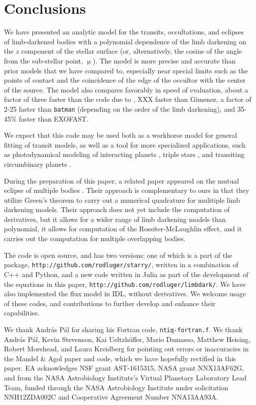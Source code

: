 \documentclass[modern]{aastex61}
\begin{document}
\section{Conclusions}

We have presented an analytic model for the transits, occultations, and
eclipses of limb-darkened bodies with a polynomial dependence of the limb darkening
on the $z$ component of the stellar surface (or, alternatively, the
cosine of the angle from the sub-stellar point, $\upmu$).  The model is more precise
and accurate than prior models that we have compared to, especially near
special limits such as the points of contact and the coincidence of the edge
of the occultor with the center of the source.  The model also compares favorably in
speed of evaluation, about a factor of three faster than the code due
to \citet{Pal2008}, XXX faster than Gimenez, a factor of 2-25 faster than \texttt{batman}
(depending on the order of the limb darkening), and 35-45\% faster than EXOFAST.

We expect that this code may be used both as a workhorse model for
general fitting of transit models, as well as a tool for more
specialized applications, such as photodynamical modeling of
interacting planets \citep{Carter2012}, triple stars \citep{Carter2011}, and 
transiting circumbinary planets \citep{Doyle2011}.

During the preparation of this paper, a related paper appeared on
the mutual eclipse of multiple bodies \citep{Short2018}.  Their
approach is complementary to ours in that they utilize Green's theorem to
carry out a numerical quadrature for mulitiple limb darkening models.
Their approach does not yet include the computation of derivatives, but 
it allows for a wider range of limb darkening models than polynomial, it
allows for computation of the Rossiter-McLaughlin effect, and it 
carries out the computation for multiple overlapping bodies.

The code is open source, and has two versions:  one of which is a part
of the \starry package, \texttt{http://github.com/rodluger/starry/}, written
in a combination of C++ and Python, and a new code written in Julia as
part of the development of the equations in this paper,
\texttt{http://github.com/rodluger/limbdark/}.  We have also implemented
the flux model in IDL, without derivatives. We welcome usage of these
codes, and contributions to further develop and enhance their capabilities.

\acknowledgements

We thank Andr\'as P\'al for sharing his Fortran code, \texttt{ntiq-fortran.f}.
We thank Andr\'as P\'al, Kevin Stevenson, Kai Ueltzh\"offer, Mario Damasso,
Matthew Heising, Robert Morehead, and Laura Kreidberg for pointing out
errors or inaccuracies in the Mandel \& Agol paper and code, which we have
hopefully rectified in this paper.
EA acknowledges NSF grant AST-1615315, NASA grant NNX13AF62G, and from
the NASA Astrobiology Institute's Virtual Planetary Laboratory Lead Team,
funded through the NASA Astrobiology Institute under solicitation NNH12ZDA002C
and Cooperative Agreement Number NNA13AA93A.
\end{document}
